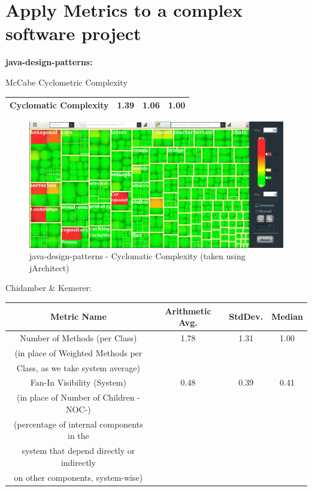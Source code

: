 \documentclass[a4paper,12pt,oneside]{scrreprt}
\begin{document}
\clearpage


\section{Apply Metrics to a complex software project}
	
	\textbf{java-design-patterns:}
		\begin{compactitem}
			\item McCabe Cyclometric Complexity\\
			
				\begin{center}
					\begin{tabular}{ |c|c|c|c| }
						\hline
						Cyclomatic Complexity & 1.39 & 1.06 & 1.00\\
						\hline
					\end{tabular}
				\end{center}
			
				\begin{figure}[H]
					\centering
					\includegraphics[scale=0.35]{design_cc.png}
					\caption{java-design-patterns - Cyclomatic Complexity (taken using jArchitect)}
				\end{figure}
			
			\item Chidamber \& Kemerer:
			\begin{center}
				\begin{tabular}{ |c|c|c|c| }
					\hline
					Metric Name &  Arithmetic Avg. & StdDev. & Median \\
					\hline
					Number of Methods (per Class) & 1.78 & 1.31 & 1.00\\
					(in place of Weighted Methods per&&&\\
					 Class, as we take system average)&&&\\
					\hline
					Fan-In Visibility (System) & 0.48 & 0.39 & 0.41\\
					(in place of Number of Children -NOC-)&&&\\
					(percentage of internal components in the&&&\\
					 system that depend directly or indirectly &&&\\
					on other components, system-wise)&&&\\
					

\end{tabular}
\end{center}
\end{compactitem}
\end{document}
